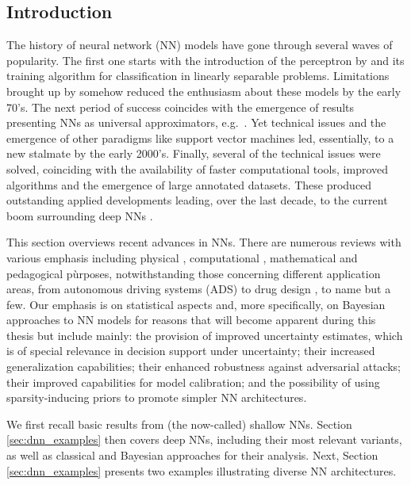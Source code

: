 
\subsection{Introduction}

The history of neural network (NN) models have gone 
through several waves of popularity. The first 
one starts with the introduction of the perceptron
by \cite{rosenblatt1958perceptron} and its training algorithm 
for classification in linearly separable problems.
Limitations brought up by 
\cite{minsky} somehow reduced the enthusiasm
about these models by the early 70's.
The next period of success coincides with the emergence
of results presenting NNs as universal
approximators, e.g.\ \parencite{cybenko1989approximation}. Yet 
technical issues and the emergence of other paradigms like 
support vector machines led, essentially,
to a new stalmate by the early 2000's. Finally, several of the 
technical issues were solved, coinciding with the 
availability of faster computational tools,
improved algorithms and the emergence of
large annotated datasets. These produced outstanding 
applied developments leading, over the last decade, to the current boom 
surrounding deep NNs \parencite{10.5555/3086952}. 

This section overviews  
recent advances in NNs. 
There are numerous reviews with various emphasis 
including physical \parencite{cirac}, computational \parencite{chollet}, mathematical \parencite{maths} and pedagogical \parencite{teach} pùrposes, 
notwithstanding  those concerning different  application areas, 
from autonomous driving systems (ADS) \parencite{rumanos} to
drug design \parencite{hessler}, to name but a few. 
Our emphasis is on statistical
aspects and, more specifically, on Bayesian approaches
to NN models for reasons that will become 
apparent during this thesis but include mainly:
the provision of improved uncertainty estimates, which is
of special relevance in decision support under uncertainty; their 
increased generalization capabilities; their 
enhanced robustness against adversarial attacks; 
their improved capabilities for model calibration;
and the possibility of using sparsity-inducing priors
to promote simpler NN architectures.

We first recall basic results from (the now-called) 
shallow NNs.
Section \ref{sec:dnn_examples} then covers deep NNs, including their most
relevant 
variants, as well as classical and Bayesian approaches
for their analysis. Next, Section \ref{sec:dnn_examples}
presents two examples illustrating
diverse NN architectures.

